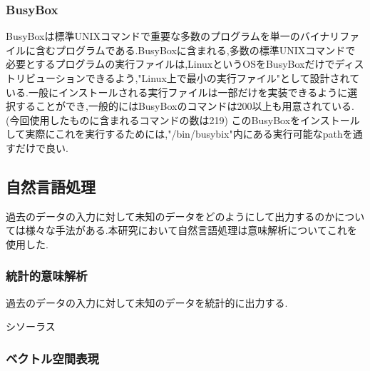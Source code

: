 \subsubsection{BusyBox}
\label{tech:BusyBox}
BusyBoxは標準UNIXコマンドで重要な多数のプログラムを単一のバイナリファイルに含むプログラムである.BusyBoxに含まれる,多数の標準UNIXコマンドで必要とするプログラムの実行ファイルは,LinuxというOSをBusyBoxだけでディストリビューションできるよう,"Linux上で最小の実行ファイル"として設計されている.一般にインストールされる実行ファイルは一部だけを実装できるように選択することができ,一般的にはBusyBoxのコマンドは200以上も用意されている.\cite{busybox}(今回使用したものに含まれるコマンドの数は219)
このBusyBoxをインストールして実際にこれを実行するためには,"/bin/busybix"内にある実行可能なpathを通すだけで良い.

\subsection{自然言語処理}
\label{tech:NLP}
過去のデータの入力に対して未知のデータをどのようにして出力するのかについては様々な手法がある.本研究において自然言語処理は意味解析についてこれを使用した.

\subsubsection{統計的意味解析}
\label{tech:tokei}
過去のデータの入力に対して未知のデータを統計的に出力する.

\label{tech:Markov}

\label{tech:Copus}

\label{tech:Siso}
シソーラス\cite{siso}

\subsubsection{ベクトル空間表現}
\label{tech:Vector}

\label{tech:Word2vec}

